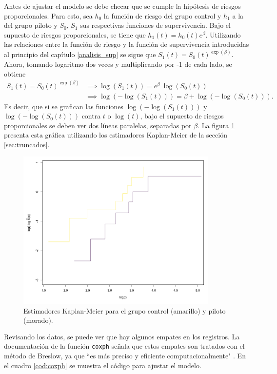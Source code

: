 \documentclass[11pt,a4paper]{article}
\begin{document}
Antes de ajustar el modelo se debe checar que se cumple la hipótesis de riesgos proporcionales. Para esto, sea $h_0$  la función de riesgo del grupo control y $h_1$ a la del grupo piloto y $S_0$, $S_1$ sus respectivas funciones de supervivencia. Bajo el supuesto de riesgos proporcionales, se tiene que $h_1(t) = h_0(t) e^\beta.$ Utilizando las relaciones entre la función de riesgo y la función de supervivencia introducidas al principio del capítulo \ref{analisis_sup} se sigue que $S_1(t) = S_0(t) ^ {\exp (\beta)}.$ Ahora, tomando logaritmo dos veces y multiplicando por -1 de cada lado, se obtiene
\begin{align*}
S_1(t) = S_0(t) ^ {\exp (\beta)} &\implies \log (S_1(t)) = e^\beta \ \log (S_0(t))\\
&\implies \log (-\log (S_1(t))) = \beta + \log (-\log (S_0(t))).
\end{align*}
Es decir, que si se grafican las funciones $\log (-\log (S_1(t)))$ y $\log (-\log (S_0(t)))$ contra $t$ o $\log (t)$, bajo el supuesto de riesgos proporcionales se deben ver dos líneas paralelas, separadas por $\beta$. La figura \ref{fig:coxph} presenta esta gráfica utilizando los estimadores Kaplan-Meier de la sección \ref{sec:truncados}.

\begin{figure}[htb]
\centering\includegraphics[width=10cm]{prop_haz_km.png}
\caption{Estimadores Kaplan-Meier para el grupo control (amarillo) y piloto (morado). }
\label{fig:coxph}
\end{figure}

Revisando los datos, se puede ver que hay algunos empates en los registros. La documentación de la función \texttt{coxph} señala que estos empates son tratados con el método de Breslow, ya que ``es más preciso y eficiente computacionalmente" \citep{survival-book}. En el cuadro \ref{cod:coxph} se muestra el código para ajustar el modelo.
\end{document}
